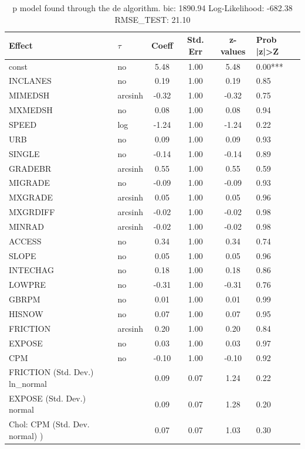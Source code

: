 \begin{table}
	\caption{p model found through the de algorithm. bic: 1890.94 Log-Likelihood: -682.38 RMSE_TEST: 21.10}
	\begin{center}
		\begin{tabular}{|l|l|c|c|c|l|}
			\hline
			Effect & $\tau$ & Coeff & Std. Err & z-values & Prob |z|>Z \\
			\hline
			const & no & 5.48 & 1.00 & 5.48 & 0.00*** \\
			\hline
			INCLANES & no & 0.19 & 1.00 & 0.19 & 0.85 \\
			\hline
			MIMEDSH & arcsinh & -0.32 & 1.00 & -0.32 & 0.75 \\
			\hline
			MXMEDSH & no & 0.08 & 1.00 & 0.08 & 0.94 \\
			\hline
			SPEED & log & -1.24 & 1.00 & -1.24 & 0.22 \\
			\hline
			URB & no & 0.09 & 1.00 & 0.09 & 0.93 \\
			\hline
			SINGLE & no & -0.14 & 1.00 & -0.14 & 0.89 \\
			\hline
			GRADEBR & arcsinh & 0.55 & 1.00 & 0.55 & 0.59 \\
			\hline
			MIGRADE & no & -0.09 & 1.00 & -0.09 & 0.93 \\
			\hline
			MXGRADE & arcsinh & 0.05 & 1.00 & 0.05 & 0.96 \\
			\hline
			MXGRDIFF & arcsinh & -0.02 & 1.00 & -0.02 & 0.98 \\
			\hline
			MINRAD & arcsinh & -0.02 & 1.00 & -0.02 & 0.98 \\
			\hline
			ACCESS & no & 0.34 & 1.00 & 0.34 & 0.74 \\
			\hline
			SLOPE & no & 0.05 & 1.00 & 0.05 & 0.96 \\
			\hline
			INTECHAG & no & 0.18 & 1.00 & 0.18 & 0.86 \\
			\hline
			LOWPRE & no & -0.31 & 1.00 & -0.31 & 0.76 \\
			\hline
			GBRPM & no & 0.01 & 1.00 & 0.01 & 0.99 \\
			\hline
			HISNOW & no & 0.07 & 1.00 & 0.07 & 0.95 \\
			\hline
			FRICTION & arcsinh & 0.20 & 1.00 & 0.20 & 0.84 \\
			\hline
			EXPOSE & no & 0.03 & 1.00 & 0.03 & 0.97 \\
			\hline
			CPM & no & -0.10 & 1.00 & -0.10 & 0.92 \\
			\hline
			FRICTION (Std. Dev.) ln_normal &  & 0.09 & 0.07 & 1.24 & 0.22 \\
			\hline
			EXPOSE (Std. Dev.) normal &  & 0.09 & 0.07 & 1.28 & 0.20 \\
			\hline
			 Chol: CPM (Std. Dev. normal) ) &  & 0.07 & 0.07 & 1.03 & 0.30 \\
			\hline
		\end{tabular}
	\end{center}
\end{table}